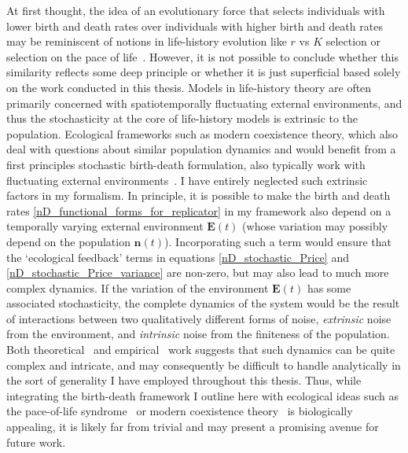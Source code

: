 At first thought, the idea of an evolutionary force that selects individuals with lower birth and death rates over individuals with higher birth and death rates may be reminiscent of notions in life-history evolution like $r$ vs $K$ selection or selection on the pace of life~\citep{stearns_evolution_1977}. However, it is not possible to conclude whether this similarity reflects some deep principle or whether it is just superficial based solely on the work conducted in this thesis. Models in life-history theory are often primarily concerned with spatiotemporally fluctuating external environments, and thus the stochasticity at the core of life-history models is extrinsic to the population. Ecological frameworks such as modern coexistence theory, which also deal with questions about similar population dynamics and would benefit from a first principles stochastic birth-death formulation, also typically work with fluctuating external environments~\citep{chesson_stabilizing_1982,chesson_multispecies_1994,barabas_chessons_2018, johnson_resolving_2022}. I have entirely neglected such extrinsic factors in my formalism. In principle, it is possible to make the birth and death rates \eqref{nD_functional_forms_for_replicator} in my framework also depend on a temporally varying external environment $\mathbf{E}(t)$ (whose variation may possibly depend on the population $\mathbf{n}(t)$). Incorporating such a term would ensure that the `ecological feedback' terms in equations \eqref{nD_stochastic_Price} and \eqref{nD_stochastic_Price_variance} are non-zero, but may also lead to much more complex dynamics. If the variation of the environment $\mathbf{E}(t)$ has some associated stochasticity, the complete dynamics of the system would be the result of interactions between two qualitatively different forms of noise, \emph{extrinsic} noise from the environment, and \emph{intrinsic} noise from the finiteness of the population. Both theoretical~\citep{gokhale_eco-evolutionary_2016,wienand_evolution_2017} and empirical~\citep{chavhan_larger_2020, chavhan_interplay_2021} work suggests that such dynamics can be quite complex and intricate, and may consequently be difficult to handle analytically in the sort of generality I have employed throughout this thesis. Thus, while integrating the birth-death framework I outline here with ecological ideas such as the pace-of-life syndrome~\citep{mathot_models_2018, wright_life-history_2019} or modern coexistence theory~\citep{barabas_chessons_2018, johnson_resolving_2022} is biologically appealing, it is likely far from trivial and may present a promising avenue for future work.

